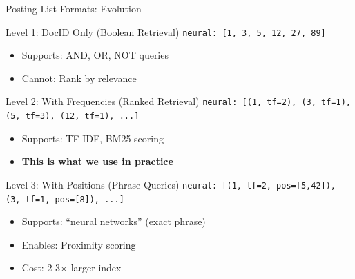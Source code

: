 \documentclass[aspectratio=169]{beamer}
\newif\ifanimated
\newcommand{\cpause}{\ifanimated\pause\fi}
\begin{document}
\begin{frame}[shrink=10]{Posting List Formats: Evolution}
\begin{block}{Level 1: DocID Only (Boolean Retrieval)}
\texttt{neural: [1, 3, 5, 12, 27, 89]}
\begin{itemize}
    \item Supports: AND, OR, NOT queries
    \item Cannot: Rank by relevance
\end{itemize}
\end{block}
\cpause

\begin{block}{Level 2: With Frequencies (Ranked Retrieval)}
\texttt{neural: [(1, tf=2), (3, tf=1), (5, tf=3), (12, tf=1), ...]}
\begin{itemize}
    \item Supports: TF-IDF, BM25 scoring
    \item \textbf{This is what we use in practice}
\end{itemize}
\end{block}
\cpause

\begin{block}{Level 3: With Positions (Phrase Queries)}
\texttt{neural: [(1, tf=2, pos=[5,42]), (3, tf=1, pos=[8]), ...]}
\begin{itemize}
    \item Supports: ``neural networks'' (exact phrase)
    \item Enables: Proximity scoring
    \item Cost: 2-3$\times$ larger index
\end{itemize}
\end{block}
\cpause
\end{frame}
\end{document}
